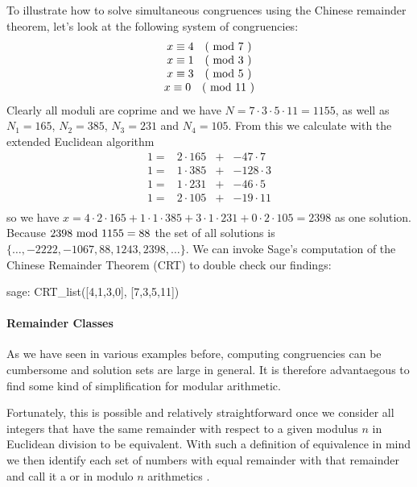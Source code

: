 \begin{example} To illustrate how to solve simultaneous congruences using the Chinese remainder theorem, let's look at the following system of congruencies:
$$
\begin{array}{c}
x \equiv 4 \quad \text{( mod } 7 \text{ )} \\
x \equiv 1 \quad \text{( mod } 3 \text{ )} \\
x \equiv 3 \quad \text{( mod } 5 \text{ )} \\
x \equiv 0 \quad \text{( mod } 11 \text{ )} \\
\end{array}
$$
Clearly all moduli are coprime and we have $ N = 7 \cdot 3 \cdot 5 \cdot 11 = 1155 $, as well as
$ N_1 = 165 $, $ N_2 = 385 $, $ N_3 = 231 $ and $ N_4 = 105 $. From this we calculate with the extended Euclidean algorithm
$$
\begin{array}{cccc}
 1 = & 2 \cdot 165  & + & -47 \cdot 7 \\
 1 = & 1 \cdot 385  & + &  -128 \cdot 3 \\
 1 = & 1 \cdot 231  & + &  -46 \cdot 5 \\
 1 = & 2 \cdot 105  & + &  -19 \cdot 11 \\
\end{array}
$$
so we have
$x = 4 \cdot 2 \cdot 165 + 1 \cdot 1 \cdot 385 + 3 \cdot 1 \cdot 231 + 0 \cdot 2 \cdot 105 = 2398$
as one solution. Because $ 2398 \text{ mod } 1155 = 88 $ the set of all solutions is
$ \{\ldots, -2222, -1067,88,1243, 2398, \ldots \} $. We can invoke Sage's computation of the Chinese Remainder Theorem (CRT) to double check our findings:
\begin{sagecommandline}
sage: CRT_list([4,1,3,0], [7,3,5,11])
\end{sagecommandline}
\end{example}

\paragraph{Remainder Classes}
As we have seen in various examples before, computing congruencies can be cumbersome and solution sets are large in general. It is therefore advantaegous to find some kind of simplification for modular arithmetic. 

Fortunately, this is possible and relatively straightforward once we consider all integers that have the same remainder with respect to a given modulus $n$ in Euclidean division to be equivalent. With such a definition of equivalence in mind we then identify each set of numbers with equal remainder with that remainder and call it a  or  in modulo $n$ arithmetics . 

